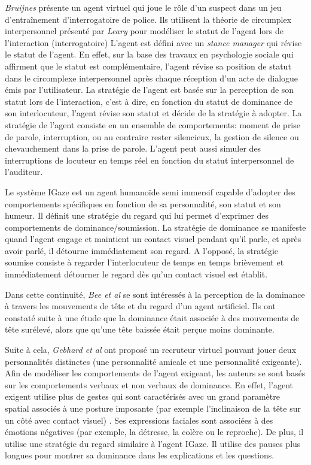 		\emph{Bruijnes} \cite{bruijnes2013affective} présente un agent virtuel qui joue le rôle d'un suspect dans un jeu d'entraînement 
		d'interrogatoire de police.
		 Ils utilisent la théorie de circumplex interpersonnel présenté par \emph{Leary} \cite{leary2004interpersonal} pour modéliser le statut de l'agent lors de l'interaction (interrogatoire)
		L'agent est défini avec un \textit{stance manager} qui révise le statut de l'agent. En effet, sur la base des travaux en psychologie sociale qui affirment que le statut est complémentaire, l'agent révise sa position de statut dans le circomplexe interpersonnel après chaque réception d'un acte de dialogue émis par l'utilisateur. La stratégie de l'agent est basée sur la perception de son statut lors de l'interaction, c'est à dire, en fonction du statut de dominance de son interlocuteur, l'agent révise son statut et décide de la stratégie à adopter. La stratégie de l'agent consiste en un ensemble de comportements: moment de prise de parole, interruption, ou au contraire rester silencieux, la gestion de silence ou chevauchement dans la prise de parole. L'agent peut aussi simuler des interruptions de locuteur en temps réel en fonction du statut interpersonnel de l'auditeur.
		
		Le système	IGaze  \cite{kipp2008igaze} est un agent humanoïde semi immersif capable d'adopter des comportements spécifiques en fonction de sa personnalité, son statut et son humeur. Il définit une stratégie du regard qui lui permet d'exprimer des comportements de dominance/soumission. La stratégie de dominance se manifeste quand l'agent engage et maintient un contact visuel pendant qu'il parle, et après avoir parlé, il détourne immédiatement son regard. A l'opposé, la stratégie soumise consiste à regarder l'interlocuteur de temps en temps brièvement et immédiatement détourner le regard dès qu'un contact visuel est établit. 
		
		Dans cette continuité, \emph{Bee et al} \cite{bee2009relations} se sont intéressés à la perception de la dominance à travers les mouvements de tête et du regard d'un agent artificiel. Ils ont constaté suite à une étude que la dominance était associée à des mouvements de tête surélevé, alors que qu'une tête baissée était perçue moins dominante.
		
		Suite à cela, \emph{Gebhard et al} \cite{gebhard2014exploring} ont proposé un recruteur virtuel pouvant jouer deux personnalités distinctes (une personnalité amicale et une personnalité exigeante). Afin de modéliser les comportements de l'agent exigeant, les auteurs se sont basés sur les comportements verbaux et non verbaux de dominance. En effet, l'agent exigent utilise plus de gestes qui sont caractérisés avec un grand paramètre spatial associés à une posture imposante (par exemple l'inclinaison de la tête sur un côté avec  contact visuel) \cite{gebhard2014exploring}. Ses expressions faciales sont associées à des émotions négatives (par exemple, la détresse, la colère ou le reproche). De plus, il utilise une stratégie du regard similaire à l'agent IGaze.
		Il utilise des pauses plus longues pour montrer sa dominance dans les explications et les questions. 
		
